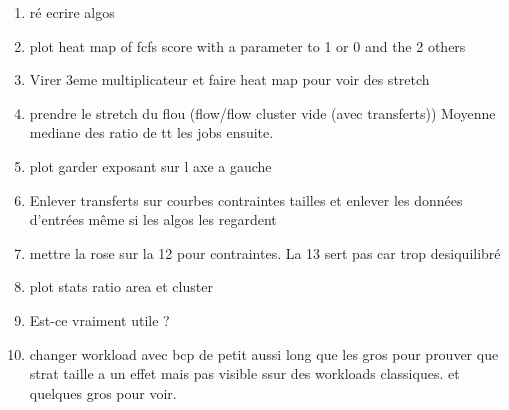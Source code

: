 \documentclass[a4paper]{article}
\begin{document}
\begin{enumerate}
			\item ré ecrire algos
			
			\item plot heat map of fcfs score with a parameter to 1 or 0 and the 2 others
			\item Virer 3eme multiplicateur et faire heat map pour voir des stretch
			\item prendre le stretch du flou (flow/flow cluster vide (avec transferts)) Moyenne mediane des ratio de tt les jobs ensuite.
			\item plot garder exposant sur l axe a gauche
			\item Enlever transferts sur courbes contraintes tailles et enlever les données d'entrées même si les algos les regardent
			\item mettre la rose sur la 12 pour contraintes. La 13 sert pas car trop desiquilibré
			\item plot stats ratio area et cluster
			\item Est-ce vraiment utile ?
			\item changer workload avec bcp de petit aussi long que les gros pour prouver que strat taille a un effet mais pas visible ssur des workloads classiques. et quelques gros pour voir.
			

\end{enumerate}
\end{document}
